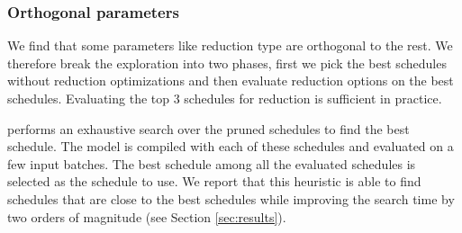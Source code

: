  \subsubsection*{Orthogonal parameters} We find that some parameters like reduction type are orthogonal to the rest. 
  We therefore break the exploration into two phases, first we pick the best schedules without reduction
  optimizations and then evaluate reduction options on the best schedules.
  Evaluating the top 3 schedules for reduction is sufficient in practice.  

\noindent
\Treebeard{} performs an exhaustive search over the pruned schedules to find the best schedule.
The model is compiled with each of these schedules and evaluated on a few input batches. 
The best schedule among all the evaluated schedules is selected as the schedule to use.
We report that this heuristic is able to find schedules that are close to the best schedules
while improving the search time by two orders of magnitude (see Section \ref{sec:results}).

